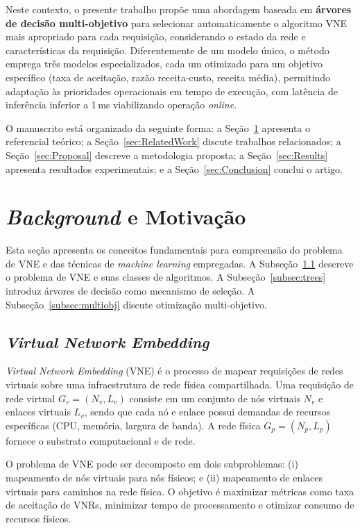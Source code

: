 \documentclass[conference]{IEEEtran}
\begin{document}
Neste contexto, o presente trabalho propõe uma abordagem baseada em \textbf{árvores de decisão multi-objetivo} para selecionar automaticamente o algoritmo VNE mais apropriado para cada requisição, considerando o estado da rede e características da requisição.
Diferentemente de um modelo único, o método emprega três modelos especializados, cada um otimizado para um objetivo específico (taxa de aceitação, razão receita-custo, receita média), permitindo adaptação às prioridades operacionais em tempo de execução, com latência de inferência inferior a 1\,ms viabilizando operação \textit{online}.

O manuscrito está organizado da seguinte forma: a Seção~\ref{sec:RefTeo} apresenta o referencial teórico; a Seção~\ref{sec:RelatedWork} discute trabalhos relacionados; a Seção~\ref{sec:Proposal} descreve a metodologia proposta; a Seção~\ref{sec:Results} apresenta resultados experimentais; e a Seção~\ref{sec:Conclusion} conclui o artigo.

\section{\textit{Background} e Motivação}
\label{sec:RefTeo}

Esta seção apresenta os conceitos fundamentais para compreensão do problema de VNE e das técnicas de \textit{machine learning} empregadas.
A Subseção~\ref{subsec:vne} descreve o problema de VNE e suas classes de algoritmos.
A Subseção~\ref{subsec:trees} introduz árvores de decisão como mecanismo de seleção.
A Subseção~\ref{subsec:multiobj} discute otimização multi-objetivo.

\subsection{\textit{Virtual Network Embedding}}
\label{subsec:vne}

\textit{Virtual Network Embedding} (VNE) é o processo de mapear requisições de redes virtuais sobre uma infraestrutura de rede física compartilhada.
Uma requisição de rede virtual $G_v = (N_v, L_v)$ consiste em um conjunto de nós virtuais $N_v$ e enlaces virtuais $L_v$, sendo que cada nó e enlace possui demandas de recursos específicas (CPU, memória, largura de banda).
A rede física $G_p = (N_p, L_p)$ fornece o substrato computacional e de rede.

O problema de VNE pode ser decomposto em dois subproblemas: (i) mapeamento de nós virtuais para nós físicos; e (ii) mapeamento de enlaces virtuais para caminhos na rede física. O objetivo é maximizar métricas como taxa de aceitação de VNRs, minimizar tempo de processamento e otimizar consumo de recursos físicos.
\end{document}
